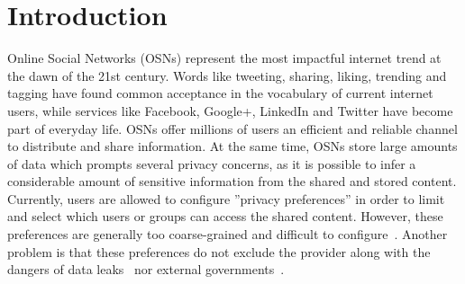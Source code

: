 \chapter{Introduction}
\label{cha:intro}
Online Social Networks (OSNs) represent the most impactful internet trend at the dawn of the 21st century. Words like tweeting, sharing, liking, trending and tagging have found common acceptance in the vocabulary of current internet users, while services like Facebook, Google+, LinkedIn and Twitter have become part of everyday life. OSNs offer millions of users an efficient and reliable channel to distribute and share information. At the same time, OSNs store large amounts of data which prompts several privacy concerns, as it is possible to infer a considerable amount of sensitive information from the shared and stored content. Currently, users are allowed to configure ''privacy preferences'' in order to limit and select which users or groups can access the shared content. However, these preferences are generally too coarse-grained and difficult to configure~\cite{art:BonneauPS10}. Another problem is that these preferences do not exclude the provider along with the dangers of data leaks~\cite{art:Fischetti11} nor external governments~\cite{prism}.




